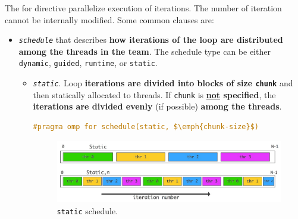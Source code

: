 \noindent
The for directive parallelize execution of iterations. The number of iteration cannot be internally modified. Some common clauses are:
\begin{itemize}
    \item \texttt{\emph{schedule}} that describes \textbf{how iterations of the loop are distributed among the threads in the team}. The schedule type can be either \texttt{dynamic}, \texttt{guided}, \texttt{runtime}, or \texttt{static}.
    \begin{itemize}
        \item \texttt{\emph{static}}. Loop \textbf{iterations are divided into blocks of size \texttt{chunk}} and then statically allocated to threads. If \texttt{chunk} is \textbf{\underline{not} specified}, the \textbf{iterations are divided evenly} (if possible) \textbf{among the threads}.
        \newpage
        \begin{openmpbox}
\begin{lstlisting}[language=C++, mathescape=true]
#pragma omp for schedule(static, $\emph{chunk-size}$)\end{lstlisting}
        \end{openmpbox}
        \begin{figure}[!htp]
            \centering
            \includegraphics[width=\textwidth]{img/openmp-for-2.pdf}
            \caption{\texttt{static} schedule.}
        \end{figure}


\end{itemize}
\end{itemize}
